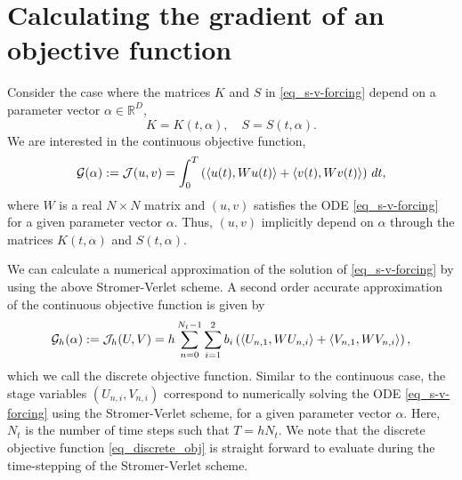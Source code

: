 \documentclass[11pt]{article}
\begin{document}
\section{Calculating the gradient of an objective function}

Consider the case where the matrices $K$ and $S$ in \eqref{eq_s-v-forcing} depend on a parameter
vector $\alpha \in {\mathbb R}^D$,
\[
K = K(t,\alpha),\quad S = S(t,\alpha).
\]
We are interested in the continuous objective function,
\[
{\cal G}(\alpha) := {\cal J}(u, v) = \int_{0}^T \left( \langle u(t),W u(t) \rangle +  \langle v(t),W v(t) \rangle\right)\, dt,
\]
where $W$ is a real $N\times N$ matrix and $(u,v)$ satisfies the ODE \eqref{eq_s-v-forcing} for a
given parameter vector $\alpha$. Thus, $(u,v)$ implicitly depend on $\alpha$ through the matrices
$K(t,\alpha)$ and $S(t,\alpha)$.

We can calculate a numerical approximation of the solution of \eqref{eq_s-v-forcing} by
using the above Stromer-Verlet scheme. A second order accurate approximation of the continuous
objective function is given by
\begin{equation}\label{eq_discrete_obj}
{\cal G}_h(\alpha) :=  {\cal J}_h(U, V) = h \sum_{n=0}^{N_t-1} \sum_{i=1}^2 b_i \left( \langle U_{n,1}, W U_{n,i}\rangle +
  \langle V_{n,1}, W V_{n,i}\rangle \right),
\end{equation}
which we call the discrete objective function. Similar to the continuous case, the stage variables
$(U_{n,i}, V_{n,i})$ correspond to numerically solving the ODE \eqref{eq_s-v-forcing} using the
Stromer-Verlet scheme, for a given parameter vector $\alpha$. Here, $N_t$ is the number of time steps such that $T=h N_t$.
We note that the discrete objective function \eqref{eq_discrete_obj} is straight forward to evaluate during the time-stepping of the
Stromer-Verlet scheme.
\end{document}
